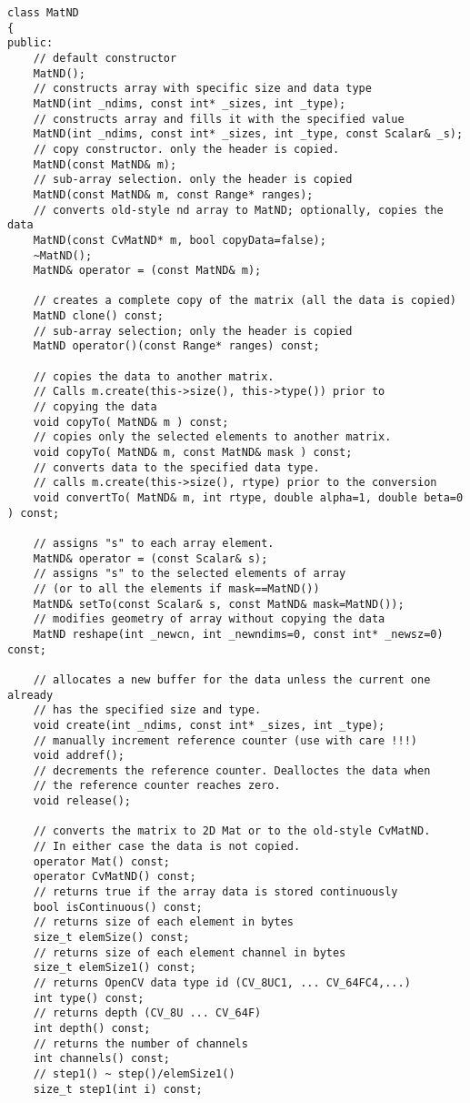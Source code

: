\begin{lstlisting}
class MatND
{
public:
    // default constructor
    MatND();
    // constructs array with specific size and data type
    MatND(int _ndims, const int* _sizes, int _type);
    // constructs array and fills it with the specified value
    MatND(int _ndims, const int* _sizes, int _type, const Scalar& _s);
    // copy constructor. only the header is copied.
    MatND(const MatND& m);
    // sub-array selection. only the header is copied
    MatND(const MatND& m, const Range* ranges);
    // converts old-style nd array to MatND; optionally, copies the data
    MatND(const CvMatND* m, bool copyData=false);
    ~MatND();
    MatND& operator = (const MatND& m);

    // creates a complete copy of the matrix (all the data is copied)
    MatND clone() const;
    // sub-array selection; only the header is copied
    MatND operator()(const Range* ranges) const;

    // copies the data to another matrix.
    // Calls m.create(this->size(), this->type()) prior to
    // copying the data
    void copyTo( MatND& m ) const;
    // copies only the selected elements to another matrix.
    void copyTo( MatND& m, const MatND& mask ) const;
    // converts data to the specified data type.
    // calls m.create(this->size(), rtype) prior to the conversion
    void convertTo( MatND& m, int rtype, double alpha=1, double beta=0 ) const;

    // assigns "s" to each array element. 
    MatND& operator = (const Scalar& s);
    // assigns "s" to the selected elements of array
    // (or to all the elements if mask==MatND())
    MatND& setTo(const Scalar& s, const MatND& mask=MatND());
    // modifies geometry of array without copying the data
    MatND reshape(int _newcn, int _newndims=0, const int* _newsz=0) const;

    // allocates a new buffer for the data unless the current one already
    // has the specified size and type.
    void create(int _ndims, const int* _sizes, int _type);
    // manually increment reference counter (use with care !!!)
    void addref();
    // decrements the reference counter. Dealloctes the data when
    // the reference counter reaches zero.
    void release();

    // converts the matrix to 2D Mat or to the old-style CvMatND.
    // In either case the data is not copied.
    operator Mat() const;
    operator CvMatND() const;
    // returns true if the array data is stored continuously 
    bool isContinuous() const;
    // returns size of each element in bytes
    size_t elemSize() const;
    // returns size of each element channel in bytes
    size_t elemSize1() const;
    // returns OpenCV data type id (CV_8UC1, ... CV_64FC4,...)
    int type() const;
    // returns depth (CV_8U ... CV_64F)
    int depth() const;
    // returns the number of channels
    int channels() const;
    // step1() ~ step()/elemSize1()
    size_t step1(int i) const;


\end{lstlisting}
